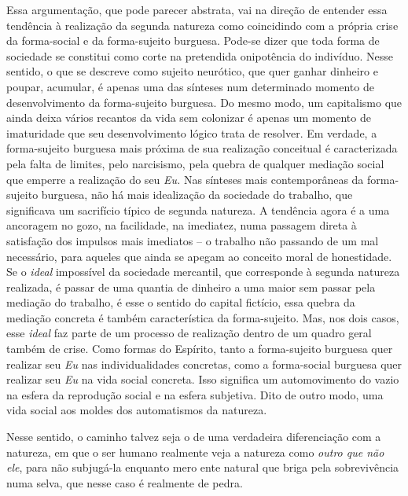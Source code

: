Essa argumentação, que pode parecer abstrata, vai na direção de entender
essa tendência à realização da segunda natureza como coincidindo com a
própria crise da forma-social e da forma-sujeito burguesa. Pode-se dizer
que toda forma de sociedade se constitui como corte na pretendida
onipotência do indivíduo. Nesse sentido, o que se descreve como sujeito
neurótico, que quer ganhar dinheiro e poupar, acumular, é apenas uma das
sínteses num determinado momento de desenvolvimento da forma-sujeito
burguesa. Do mesmo modo, um capitalismo que ainda deixa vários recantos
da vida sem colonizar é apenas um momento de imaturidade que seu
desenvolvimento lógico trata de resolver. Em verdade, a forma-sujeito
burguesa mais próxima de sua realização conceitual é caracterizada pela
falta de limites, pelo narcisismo, pela quebra de qualquer mediação
social que emperre a realização do seu \emph{Eu.} Nas sínteses mais
contemporâneas da forma-sujeito burguesa, não há mais idealização da
sociedade do trabalho, que significava um sacrifício típico de segunda
natureza. A tendência agora é a uma ancoragem no gozo, na facilidade, na
imediatez, numa passagem direta à satisfação dos impulsos mais imediatos
-- o trabalho não passando de um mal necessário, para aqueles que ainda
se apegam ao conceito moral de honestidade. Se o \emph{ideal} impossível
da sociedade mercantil, que corresponde à segunda natureza realizada, é
passar de uma quantia de dinheiro a uma maior sem passar pela mediação
do trabalho, é esse o sentido do capital fictício, essa quebra da
mediação concreta é também característica da forma-sujeito. Mas, nos
dois casos, esse \emph{ideal} faz parte de um processo de realização
dentro de um quadro geral também de crise. Como formas do Espírito,
tanto a forma-sujeito burguesa quer realizar seu \emph{Eu} nas
individualidades concretas, como a forma-social burguesa quer realizar
seu \emph{Eu} na vida social concreta. Isso significa um automovimento
do vazio na esfera da reprodução social e na esfera subjetiva. Dito de
outro modo, uma vida social aos moldes dos automatismos da natureza.

Nesse sentido, o caminho talvez seja o de uma verdadeira diferenciação
com a natureza, em que o ser humano realmente veja a natureza como
\emph{outro que não ele}, para não subjugá-la enquanto mero ente natural
que briga pela sobrevivência numa selva, que nesse caso é realmente de
pedra.

